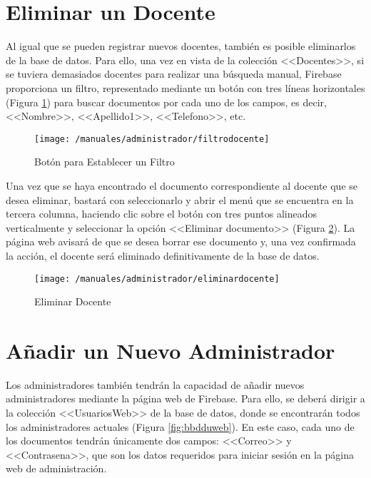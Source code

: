 \section*{Eliminar un Docente}
Al igual que se pueden registrar nuevos docentes, también es posible eliminarlos de la base de datos. Para ello, una vez en vista de la colección <<Docentes>>, si se tuviera demasiados docentes para realizar una búsqueda manual, Firebase proporciona un filtro, representado mediante un botón con tres líneas horizontales (Figura \ref{fig:filtrodocente}) para buscar documentos por cada uno de los campos, es decir, <<Nombre>>, <<Apellido1>>, <<Telefono>>, etc.

\begin{figure}[!h]
	\begin{center}
		\texttt{[image: /manuales/administrador/filtrodocente]}
		\caption{Botón para Establecer un Filtro}
		\label{fig:filtrodocente}
	\end{center}
\end{figure}

\clearpage

Una vez que se haya encontrado el documento correspondiente al docente que se desea eliminar, bastará con seleccionarlo y abrir el menú que se encuentra en la tercera columna, haciendo clic sobre el botón con tres puntos alineados verticalmente y seleccionar la opción <<Eliminar documento>> (Figura \ref{fig:eliminardocente}). La página web avisará de que se desea borrar ese documento y, una vez confirmada la acción, el docente será eliminado definitivamente de la base de datos.

\begin{figure}[!h]
	\begin{center}
		\texttt{[image: /manuales/administrador/eliminardocente]}
		\caption{Eliminar Docente}
		\label{fig:eliminardocente}
	\end{center}
\end{figure}

\clearpage

\section*{Añadir un Nuevo Administrador}
Los administradores también tendrán la capacidad de añadir nuevos administradores mediante la página web de Firebase. Para ello, se deberá dirigir a la colección <<UsuariosWeb>> de la base de datos, donde se encontrarán todos los administradores actuales (Figura \ref{fig:bbdduweb}). En este caso, cada uno de los documentos tendrán únicamente dos campos: <<Correo>> y <<Contrasena>>, que son los datos requeridos para iniciar sesión en la página web de administración.

